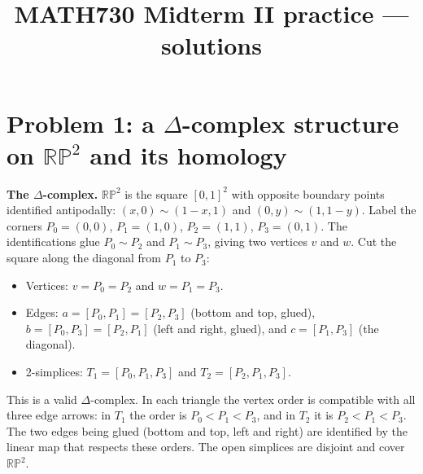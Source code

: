 \documentclass[11pt]{article}
\title{MATH730 Midterm II practice --- solutions}
\date{}
\newcommand{\RP}{\mathbb{RP}}
\begin{document}
\maketitle
\vspace{-2.5em}

\section*{Problem 1: a $\Delta$-complex structure on $\RP^2$ and its homology}

\textbf{The $\Delta$-complex.} $\RP^2$ is the square $[0,1]^2$ with opposite boundary points identified antipodally: $(x,0)\sim(1-x,1)$ and $(0,y)\sim(1,1-y)$. Label the corners $P_0=(0,0)$, $P_1=(1,0)$, $P_2=(1,1)$, $P_3=(0,1)$. The identifications glue $P_0\sim P_2$ and $P_1\sim P_3$, giving two vertices $v$ and $w$. Cut the square along the diagonal from $P_1$ to $P_3$:
\begin{center}
\end{center}
\begin{itemize}
\item Vertices: $v=P_0=P_2$ and $w=P_1=P_3$.
\item Edges: $a=[P_0,P_1]=[P_2,P_3]$ (bottom and top, glued), $b=[P_0,P_3]=[P_2,P_1]$ (left and right, glued), and $c=[P_1,P_3]$ (the diagonal).
\item 2-simplices: $T_1=[P_0,P_1,P_3]$ and $T_2=[P_2,P_1,P_3]$.
\end{itemize}
This is a valid $\Delta$-complex. In each triangle the vertex order is compatible with all three edge arrows: in $T_1$ the order is $P_0<P_1<P_3$, and in $T_2$ it is $P_2<P_1<P_3$. The two edges being glued (bottom and top, left and right) are identified by the linear map that respects these orders. The open simplices are disjoint and cover $\RP^2$.
\end{document}
